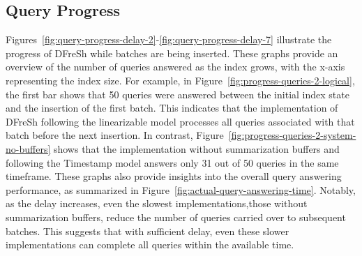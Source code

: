 \subsection{Query Progress}
Figures~\ref{fig:query-progress-delay-2}-\ref{fig:query-progress-delay-7} illustrate
the progress of DFreSh while batches are being inserted. These graphs provide an overview
of the number of queries answered as the index grows, with the x-axis representing the
index size.
%
For example, in Figure~\ref{fig:progress-queries-2-logical}, the first bar shows
that 50 queries were answered between the initial index state and the insertion of
the first batch. This indicates that the implementation of DFreSh following the linearizable model
processes all queries associated with that batch before the next insertion. In contrast,
Figure~\ref{fig:progress-queries-2-system-no-buffers} shows that the implementation
without summarization buffers and following the Timestamp model answers only 31 out of 50
queries in the same timeframe.
%
These graphs also provide insights into the overall query answering performance, as
summarized in Figure~\ref{fig:actual-query-answering-time}. Notably, as the delay
increases, even the slowest implementations,those without summarization buffers, reduce
the number of queries carried over to subsequent batches. This suggests that with
sufficient delay, even these slower implementations can complete all queries within
the available time.
